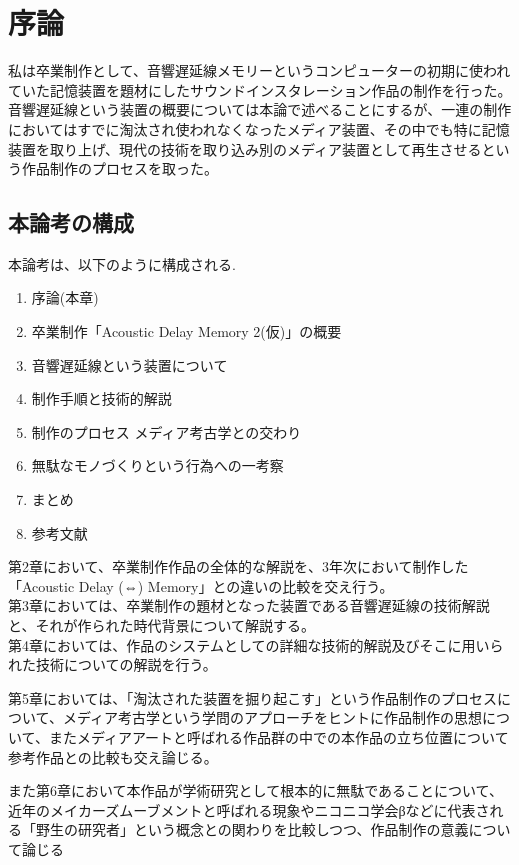 \chapter{序論}\label{ux5e8fux8ad6}

私は卒業制作として、音響遅延線メモリーというコンピューターの初期に使われていた記憶装置を題材にしたサウンドインスタレーション作品の制作を行った。\\
音響遅延線という装置の概要については本論で述べることにするが、一連の制作においてはすでに淘汰され使われなくなったメディア装置、その中でも特に記憶装置を取り上げ、現代の技術を取り込み別のメディア装置として再生させるという作品制作のプロセスを取った。

\section{本論考の構成}\label{ux672cux8ad6ux8003ux306eux69cbux6210}

本論考は、以下のように構成される.

\begin{enumerate}
\def\labelenumi{\arabic{enumi}.}
\tightlist
\item
  序論(本章)
\item
  卒業制作「Acoustic Delay Memory 2(仮)」の概要
\item
  音響遅延線という装置について
\item
  制作手順と技術的解説
\item
  制作のプロセス メディア考古学との交わり
\item
  無駄なモノづくりという行為への一考察
\item
  まとめ
\item
  参考文献
\end{enumerate}

第2章において、卒業制作作品の全体的な解説を、3年次において制作した「Acoustic
Delay (⇔) Memory」との違いの比較を交え行う。\\
第3章においては、卒業制作の題材となった装置である音響遅延線の技術解説と、それが作られた時代背景について解説する。\\
第4章においては、作品のシステムとしての詳細な技術的解説及びそこに用いられた技術についての解説を行う。

第5章においては、「淘汰された装置を掘り起こす」という作品制作のプロセスについて、メディア考古学という学問のアプローチをヒントに作品制作の思想について、またメディアアートと呼ばれる作品群の中での本作品の立ち位置について参考作品との比較も交え論じる。

また第6章において本作品が学術研究として根本的に無駄であることについて、近年のメイカーズムーブメントと呼ばれる現象やニコニコ学会βなどに代表される「野生の研究者」という概念との関わりを比較しつつ、作品制作の意義について論じる

